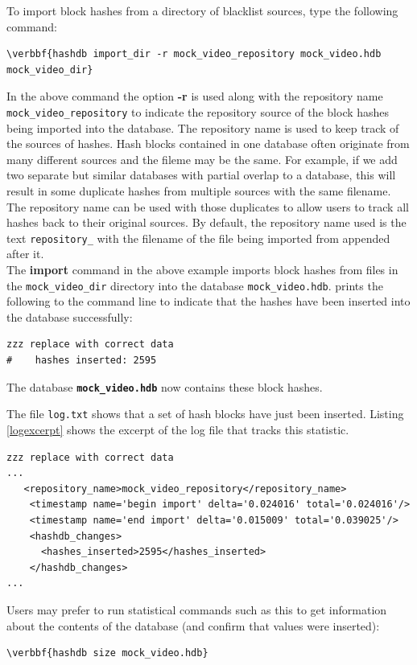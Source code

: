 \documentclass[11pt,fleqn]{article} %
\begin{document}
To import block hashes from a directory of blacklist sources, type the following command:
\begin{Verbatim}[commandchars=\\\{\}]
\verbbf{hashdb import_dir -r mock_video_repository mock_video.hdb mock_video_dir}
\end{Verbatim}
In the above command the option \textbf{-r} is used along with the repository name \texttt{mock\_video\_repository} to indicate the repository source of the block hashes being imported into the database. The repository name is used to keep track of the sources of hashes. Hash blocks contained in one database often originate from many different sources and the fileme may be the same. For example, if we add two separate but similar databases with partial overlap to a database, this will result in some duplicate hashes from multiple sources with the same filename. The repository name can be used with those duplicates to allow users to track all hashes back to their original sources. By default, the repository name used is the text \texttt{repository\_} with the filename of the file being imported from appended after it.\\

The \textbf{import} command in the above example imports block hashes from files in the \texttt{mock\_video\_dir} directory into the database \texttt{mock\_video.hdb}. \hdb prints the following to the command line to indicate that the hashes have been inserted into the database successfully: 

\begingroup
\footnotesize
\begin{Verbatim}[fontfamily=courier]
zzz replace with correct data
#    hashes inserted: 2595
\end{Verbatim}
\endgroup
The database \texttt{\textbf{mock\_video.hdb}} now contains these block hashes.

The file \texttt{log.txt} shows that a set of hash blocks have just been inserted. Listing \ref{logexcerpt} shows the excerpt of the log file that tracks this statistic.
\lstset{style=customfile}
\begin{lstlisting}[float, caption=Excerpt of the \texttt{log.xml} indicating hash blocks were inserted, label=logexcerpt]
zzz replace with correct data
...   
   <repository_name>mock_video_repository</repository_name>
    <timestamp name='begin import' delta='0.024016' total='0.024016'/>
    <timestamp name='end import' delta='0.015009' total='0.039025'/>
    <hashdb_changes>
      <hashes_inserted>2595</hashes_inserted>      
    </hashdb_changes>
...
\end{lstlisting}
Users may prefer to run statistical commands such as this to get information about the contents of the database (and confirm that values were inserted):
\begin{Verbatim}[commandchars=\\\{\}]
\verbbf{hashdb size mock_video.hdb}
\end{Verbatim}
\end{document}

